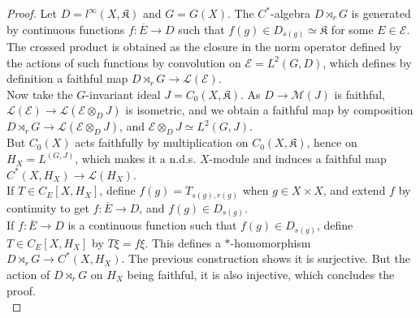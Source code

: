 \begin{proof}
Let $D=l^\infty(X,\mathfrak K)$ and $G=G(X)$. The $C^*$-algebra $D\rtimes_r G$ is generated by continuous functions $f : \overline E \rightarrow D$ such that $f(g)\in D_{s(g)}\simeq \mathfrak K$ for some $E\in \mathcal E$. The crossed product is obtained as the closure in the norm operator defined by the actions of such functions by convolution on $\mathcal E = L^2(G,D)$, which defines by definition a faithful map $D\rtimes_r G \rightarrow \mathcal L(\mathcal E)$.\\

Now take the $G$-invariant ideal $J= C_0(X,\mathfrak K)$. As $D\rightarrow \mathcal M(J)$ is faithful, $\mathcal L(\mathcal E)\rightarrow \mathcal L(\mathcal E\otimes_{D} J)$ is isometric, and we obtain a faithful map by composition $D\rtimes_r G \rightarrow \mathcal L(\mathcal E\otimes_D J)$, and $\mathcal E\otimes_D J \simeq L^2(G,J)$.\\

But $C_0(X)$ acts faithfully by multiplication on $C_0(X,\mathfrak K)$, hence on $H_X=L^(G,J)$, which makes it a n.d.s. $X$-module and induces a faithful map $C^*(X,H_X) \rightarrow \mathcal L(H_X)$.\\

If $T\in C_E[X,H_X]$, define $f(g)=T_{s(g),r(g)}$ when $g\in X\times X$, and extend $f$ by continuity to get $f : \overline E \rightarrow D$, and $f(g)\in D_{s(g)}$.\\

If $f:\overline E \rightarrow D$ is a continuous function such that $f(g)\in D_{s(g)}$, define $T\in C_E[X,H_X]$ by $T\xi = f\xi$. This defines a $*$-homomorphism $D\rtimes_r G \rightarrow C^*(X,H_X)$. The previous construction shows it is surjective. But the action of $D\rtimes_r G$ on $H_X$ being faithful, it is also injective, which concludes the proof.\\
\end{proof}












